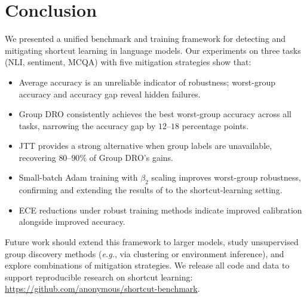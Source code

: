 \documentclass[10pt,twocolumn]{article}
\newcommand{\eg}{\emph{e.g.}\xspace}
\begin{document}
\section{Conclusion}
\label{sec:conclusion}

We presented a unified benchmark and training framework for
detecting and mitigating shortcut learning in language models.
Our experiments on three tasks (NLI, sentiment, MCQA) with
five mitigation strategies show that:

\begin{itemize}[leftmargin=*,itemsep=2pt]
\item Average accuracy is an unreliable indicator of
  robustness; worst-group accuracy and accuracy gap reveal
  hidden failures.
\item Group DRO consistently achieves the best worst-group
  accuracy across all tasks, narrowing the accuracy gap by
  $12$--$18$ percentage points.
\item JTT provides a strong alternative when group labels are
  unavailable, recovering $80$--$90\%$ of Group DRO's gains.
\item Small-batch Adam training with $\beta_2$ scaling
  improves worst-group robustness, confirming and extending
  the results of \citet{marek2025scaling} to the
  shortcut-learning setting.
\item ECE reductions under robust training methods indicate
  improved calibration alongside improved accuracy.
\end{itemize}

\noindent
Future work should extend this framework to larger
models, study unsupervised group discovery methods
(\eg, via clustering or environment inference), and
explore combinations of mitigation strategies.
We release all code and data to support reproducible research
on shortcut learning: \url{https://github.com/anonymous/shortcut-benchmark}.


\end{document}
